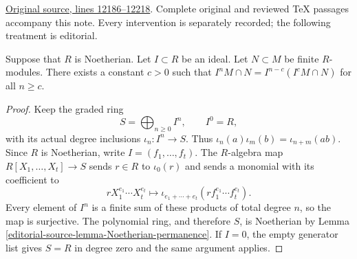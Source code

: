 \hypertarget{algebra-context-159}{}

\noindent\href{https://github.com/stacks/stacks-project/blob/a04446e57ec1fbc252a871afcec7752fb2807b14/algebra.tex\#L12186}{Original source, lines 12186--12218}. Complete original and reviewed TeX passages accompany this note. Every intervention is separately recorded; the following treatment is editorial.


\begin{lemma}
\label{editorial-source-lemma-Artin-Rees}
Suppose that $R$ is Noetherian. Let $I \subset R$ be an ideal.
Let $N \subset M$ be finite $R$-modules.
There exists a constant $c > 0$ such that
$I^n M \cap N  =  I^{n-c}(I^cM \cap N)$ for all $n \geq c$.
\end{lemma}

\begin{proof}
Keep the graded ring
$$
S=\bigoplus_{n\geq0}I^n,\qquad I^0=R,
$$
with its actual degree inclusions $\iota_n:I^n\to S$.
Thus $\iota_n(a)\iota_m(b)=\iota_{n+m}(ab)$.
Since $R$ is Noetherian, write $I=(f_1,\ldots,f_t)$.
The $R$-algebra map $R[X_1,\ldots,X_t]\to S$ sends $r\in R$
to $\iota_0(r)$ and sends a monomial with its coefficient to
$$
rX_1^{e_1}\cdots X_t^{e_t}
\longmapsto
\iota_{e_1+\cdots+e_t}
 (rf_1^{e_1}\cdots f_t^{e_t}).
$$
Every element of $I^n$ is a finite sum of these products of total
degree $n$, so the map is surjective. The polynomial ring, and
therefore $S$, is Noetherian by Lemma
\ref{editorial-source-lemma-Noetherian-permanence}. If $I=0$, the empty generator
list gives $S=R$ in degree zero and the same argument applies.


\end{proof}
